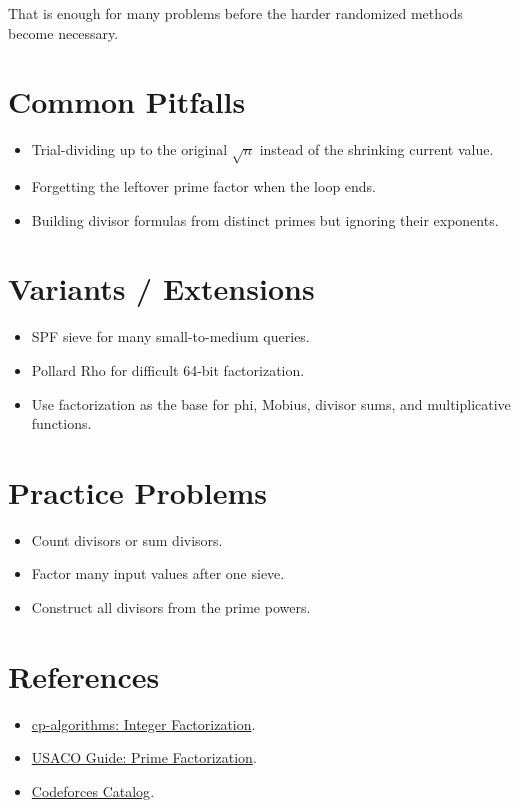 That is enough for many problems before the harder randomized methods become necessary.

\section*{Common Pitfalls}

\begin{itemize}
  \item Trial-dividing up to the original \(\sqrt{n}\) instead of the shrinking current value.
  \item Forgetting the leftover prime factor when the loop ends.
  \item Building divisor formulas from distinct primes but ignoring their exponents.
\end{itemize}

\section*{Variants / Extensions}

\begin{itemize}
  \item SPF sieve for many small-to-medium queries.
  \item Pollard Rho for difficult 64-bit factorization.
  \item Use factorization as the base for phi, Mobius, divisor sums, and multiplicative functions.
\end{itemize}

\section*{Practice Problems}

\begin{itemize}
  \item Count divisors or sum divisors.
  \item Factor many input values after one sieve.
  \item Construct all divisors from the prime powers.
\end{itemize}

\section*{References}

\begin{itemize}
  \item \href{https://cp-algorithms.com/algebra/factorization.html}{cp-algorithms: Integer Factorization}.
  \item \href{https://usaco.guide/gold/prime-factorization}{USACO Guide: Prime Factorization}.
  \item \href{https://codeforces.com/catalog?locale=en}{Codeforces Catalog}.
\end{itemize}
